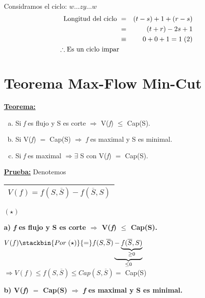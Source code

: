 \documentclass[12pt,a4paper]{report}
\begin{document}
\begin{itemize}
\begin{itemize}
						\par Considramos el ciclo: $w \dotsc z y \dotsc w$
						\begin{eqnarray}
							\nonumber \textup{Longitud del ciclo } &=& (t - s) + 1 + (r - s) \\
							\nonumber &=& (t+r) - 2s + 1 \\
							\nonumber &\equiv & 0 + 0 + 1 = 1 \; (2) \\
							\nonumber \therefore \textup{Es un ciclo impar}
						\end{eqnarray}
					\end{itemize}
			\end{itemize}


	\section{Teorema Max-Flow Min-Cut}
		\textbf{\underline{Teorema:}}
		\begin{enumerate}[a)]
			\item Si \textit{f} es flujo y S es corte $\Rightarrow$ V(\textit{f}) $\leq$ Cap(S).
			\item Si V(\textit{f}) $=$ Cap(S) $\Rightarrow$ \textit{f} es maximal y S es minimal.
			\item Si \textit{f} es maximal $\Rightarrow \exists$ S con V(\textit{f}) $=$ Cap(S).
		\end{enumerate}

		\textbf{\underline{Prueba:}} Denotemos \begin{tabular}{|c|} \hline $V(\textit{f}) = f(S, \overline{S}) - f(\overline{S},S)$ \\ \hline \end{tabular} $(\star)$

		\vspace{5mm}
		\textbf{a) \textit{f} es flujo y S es corte $\Rightarrow$ V(\textit{f}) $\leq$ Cap(S).}

			\begin{center}
				$V(f) \stackbin{Por \; (\star)}{=} f(S, \overline{S})\underbrace{-\underbrace{f(\overline{S}, S)}_{\geq 0}}_{\leq 0}$ \\

				\vspace{5mm}
				$\Rightarrow V(f ) \leq f(S, \overline{S}) \leq Cap(S, \overline{S}) =$ Cap(S)
			\end{center}

		\textbf{b) V(\textit{f}) $=$ Cap(S) $\Rightarrow$ \textit{f} es maximal y S es minimal.}
\end{document}
